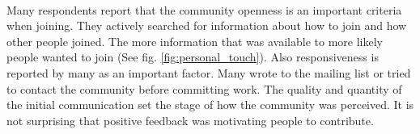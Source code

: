 \\
Many respondents report that the community openness is an important criteria when joining. They actively searched for information about how to join and how other people joined. The more information that was available to more likely people wanted to join (See fig. \ref{fig:personal_touch}). Also responsiveness is reported by many as an important factor. Many wrote to the mailing list or tried to contact the community before committing work. The quality and quantity of the initial communication set the stage of how the community was perceived. It is not surprising that positive feedback was motivating people to contribute.